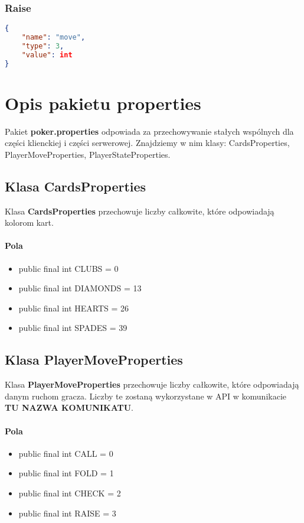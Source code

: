 \documentclass{article}
\begin{document}
        \subsubsection{Raise}
            \begin{lstlisting}[language=json,firstnumber=1]
{
    "name": "move",
    "type": 3,
    "value": int
}
            \end{lstlisting}


\section{Opis pakietu properties}
    Pakiet \textbf{poker.properties} odpowiada za przechowywanie stałych wspólnych dla części klienckiej i części serwerowej.
    Znajdziemy w nim klasy: CardsProperties, PlayerMoveProperties, PlayerStateProperties.
    
    \subsection{Klasa CardsProperties}
        Klasa \textbf{CardsProperties} przechowuje liczby całkowite, które odpowiadają kolorom kart.
        \paragraph{Pola}
            \begin{itemize}
                \item public final int CLUBS = 0
                \item public final int DIAMONDS = 13
                \item public final int HEARTS = 26
                \item public final int SPADES = 39
            \end{itemize}
            
    \subsection{Klasa PlayerMoveProperties}
        Klasa \textbf{PlayerMoveProperties} przechowuje liczby całkowite, które odpowiadają danym ruchom gracza.
        Liczby te zostaną wykorzystane w API w komunikacie \textbf{TU NAZWA KOMUNIKATU}.
        \paragraph{Pola}
            \begin{itemize}
                \item public final int CALL = 0
                \item public final int FOLD = 1
                \item public final int CHECK = 2
                \item public final int RAISE = 3
            \end{itemize}
    
\end{document}
